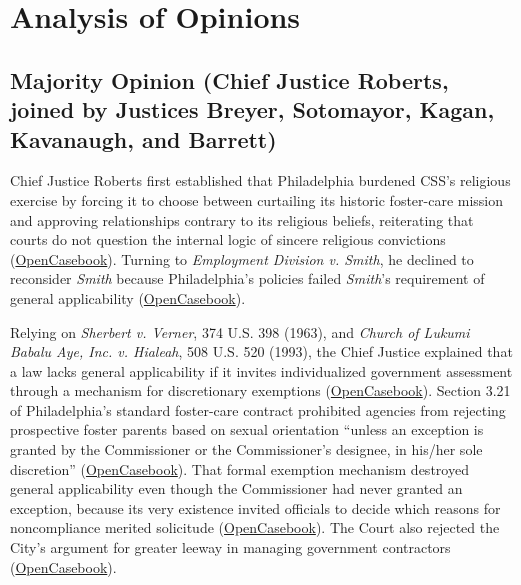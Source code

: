 \documentclass[12pt]{article}
\begin{document}
\section{Analysis of Opinions}

\subsection{Majority Opinion (Chief Justice Roberts, joined by Justices Breyer, Sotomayor, Kagan, Kavanaugh, and Barrett)}
Chief Justice Roberts first established that Philadelphia burdened CSS's religious exercise by forcing it to choose between curtailing its historic foster-care mission and approving relationships contrary to its religious beliefs, reiterating that courts do not question the internal logic of sincere religious convictions (\href{https://opencasebook.org/casebooks/4501-constitutional-law/resources/12.9-fulton-v-city-of-philadelphia-2020/}{OpenCasebook}). Turning to \textit{Employment Division v. Smith}, he declined to reconsider \textit{Smith} because Philadelphia's policies failed \textit{Smith}'s requirement of general applicability (\href{https://opencasebook.org/casebooks/4501-constitutional-law/resources/12.9-fulton-v-city-of-philadelphia-2020/}{OpenCasebook}).

Relying on \textit{Sherbert v. Verner}, 374 U.S. 398 (1963), and \textit{Church of Lukumi Babalu Aye, Inc. v. Hialeah}, 508 U.S. 520 (1993), the Chief Justice explained that a law lacks general applicability if it invites individualized government assessment through a mechanism for discretionary exemptions (\href{https://opencasebook.org/casebooks/4501-constitutional-law/resources/12.9-fulton-v-city-of-philadelphia-2020/}{OpenCasebook}). Section 3.21 of Philadelphia's standard foster-care contract prohibited agencies from rejecting prospective foster parents based on sexual orientation ``unless an exception is granted by the Commissioner or the Commissioner's designee, in his/her sole discretion'' (\href{https://opencasebook.org/casebooks/4501-constitutional-law/resources/12.9-fulton-v-city-of-philadelphia-2020/}{OpenCasebook}). That formal exemption mechanism destroyed general applicability even though the Commissioner had never granted an exception, because its very existence invited officials to decide which reasons for noncompliance merited solicitude (\href{https://opencasebook.org/casebooks/4501-constitutional-law/resources/12.9-fulton-v-city-of-philadelphia-2020/}{OpenCasebook}). The Court also rejected the City's argument for greater leeway in managing government contractors (\href{https://opencasebook.org/casebooks/4501-constitutional-law/resources/12.9-fulton-v-city-of-philadelphia-2020/}{OpenCasebook}).
\end{document}
